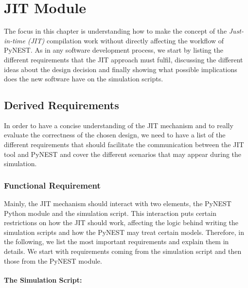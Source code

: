 
\chapter{JIT Module}
The focus in this chapter is understanding how to make the concept of the \emph{Just-in-time (JIT)} compilation work without directly affecting the workflow of PyNEST. As in any software development process, we start by listing the different requirements that the JIT approach must fulfil, discussing the different ideas about the design decision and finally showing what possible implications does the new software have on the simulation scripts.

 \label{chap:jit}
\section{Derived Requirements}
In order to have a concise understanding of the JIT mechanism and to really evaluate the correctness of the chosen design, we need to have a list of the different requirements that should facilitate the communication between  the JIT tool and PyNEST and cover the different scenarios that may appear during the simulation. 
\subsection{Functional Requirement}



Mainly, the JIT mechanism should interact with two elements, the PyNEST Python module and the simulation script. This interaction puts certain restrictions on how the JIT should work, affecting the logic behind writing the simulation scripts and how the PyNEST may treat certain models. Therefore, in the following, we list the most important requirements and explain them in details. We start with requirements coming from the simulation script and then those from the PyNEST module.

\subsubsection*{The Simulation Script:}


